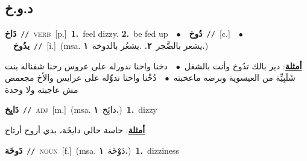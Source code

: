 \documentclass[10pt,a4paper,twoside]{article} %
\begin{document}
\begin{multicols}{2}
\vspace{-3mm}
\subsection*{\color{blue}\foreignlanguage{arabic}{د.و.خ}\color{blue}{}} 

{\setlength\topsep{0pt}\textbf{\foreignlanguage{arabic}{دَاخ}}\ {\color{gray}\texttt{//}\color{black}}\ \textsc{verb}\ [p.]\ \textbf{1.}~feel dizzy.  \textbf{2.}~be fed up\ \ $\bullet$\ \ \setlength\topsep{0pt}\textbf{\foreignlanguage{arabic}{دُوخ}}\ {\color{gray}\texttt{//}\color{black}}\ [c.]\ \ $\bullet$\ \ \setlength\topsep{0pt}\textbf{\foreignlanguage{arabic}{يدُوخ}}\ {\color{gray}\texttt{//}\color{black}}\ [i.]\ \color{gray}(msa. \foreignlanguage{arabic}{يشعر بالضَّجر}~\foreignlanguage{arabic}{\textbf{٢.}}  .\foreignlanguage{arabic}{يشعُر بالدوخة}~\foreignlanguage{arabic}{\textbf{١.}})\color{black}\  \begin{flushright}\color{gray}\foreignlanguage{arabic}{\textbf{\underline{\foreignlanguage{arabic}{أمثلة}}}: دير بالك تدُوخ وأنت بالشغل\ $\bullet$\ \  دخنا واحنا ندورله على عروس رحنا شفناله بنت شَلَبِيِّة من العيسوية وبرضه ماعحبته\ $\bullet$\ \  دُخْنا واحنا ندوِّله على عرايس والأخ مجعمص مش عاجبته ولا وحدة}\end{flushright}\color{black}} \vspace{2mm}

{\setlength\topsep{0pt}\textbf{\foreignlanguage{arabic}{دَايِخ}}\ {\color{gray}\texttt{//}\color{black}}\ \textsc{adj}\ [m.]\ \color{gray}(msa. \foreignlanguage{arabic}{دائِخ}~\foreignlanguage{arabic}{\textbf{١.}})\color{black}\ \textbf{1.}~dizzy\  \begin{flushright}\color{gray}\foreignlanguage{arabic}{\textbf{\underline{\foreignlanguage{arabic}{أمثلة}}}: حاسة حالي دايخَة، بدي أروح أرتاح}\end{flushright}\color{black}} \vspace{2mm}

{\setlength\topsep{0pt}\textbf{\foreignlanguage{arabic}{دَوخَة}}\ {\color{gray}\texttt{//}\color{black}}\ \textsc{noun}\ [f.]\ \color{gray}(msa. \foreignlanguage{arabic}{دَوْخَة}~\foreignlanguage{arabic}{\textbf{١.}})\color{black}\ \textbf{1.}~dizziness\ } \vspace{2mm}


\end{multicols}
\end{document}
